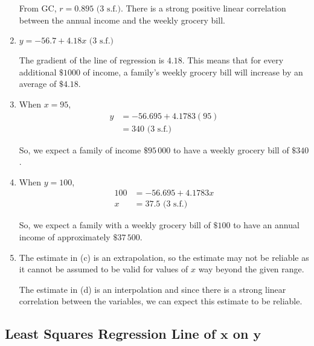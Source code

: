 \documentclass[11pt,a4paper]{book}
\begin{document}
\begin{example}
\begin{enumerate}[label=(\alph*)]
From GC, $r=0.895\text{ (3 s.f.)}$. There is a strong positive linear
correlation between the annual income and the weekly grocery bill.

\item  $y=-56.7+4.18x\text{ (3 s.f.)}$

The gradient of the line of regression is $4.18$. This means that
for every additional $\$1000$ of income, a family's weekly grocery
bill will increase by an average of $\$4.18$.

\item  When $x=95$,
\begin{align*}
y & =-56.695+4.1783\left(95\right)\\
 & =340\text{ (3 s.f.)}
\end{align*}

So, we expect a family of income $\$95\,000$ to have a weekly grocery
bill of $\$340$.

\item  When $y=100$,
\begin{align*}
100 & =-56.695+4.1783x\\
x & =37.5\text{ (3 s.f.)}
\end{align*}

So, we expect a family with a weekly grocery bill of $\$100$ to have
an annual income of approximately $\$37\,500$.

\item  The estimate in (c) is an extrapolation, so the estimate may
not be reliable as it cannot be assumed to be valid for values of
$x$ way beyond the given range.

The estimate in (d) is an interpolation and since there is a strong
linear correlation between the variables, we can expect this estimate
to be reliable.

\end{enumerate}

\end{example}

\subsection{Least Squares Regression Line of $\boldsymbol{x}$ on $\boldsymbol{y}$}
\end{document}
